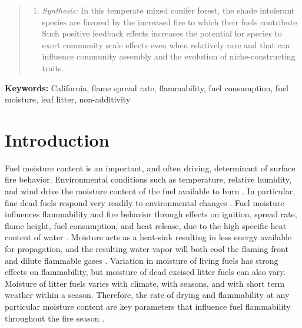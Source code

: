 \documentclass[letterpaper,12pt]{article}
\begin{document}
\begin{abstract}
\begin{enumerate}
    positive with fuel drying. Litter mixtures burn with fire behavior more
    similar to that of the most flammable constituent species and this effect
    increases as fuels dry.
      \item \emph{Synthesis:} In this temperate mixed conifer forest, the shade
    intolerant species are favored by the increased fire to which their fuels
    contribute Such positive feedback effects increases the potential for
    species to exert community scale effects even when relatively rare and that
    can influence community assembly and the evolution of niche-constructing
    traits.
  \end{enumerate}
\end{abstract}

\noindent \textbf{Keywords:} California, flame spread rate, flammability, fuel consumption, fuel moisture, leaf litter, non-additivity

\newpage

\section*{Introduction}

Fuel moisture content is an important, and often driving, determinant of
surface fire behavior. Environmental conditions such as temperature, relative
humidity, and wind drive the moisture content of the fuel available to burn
\citep{Kreye+Varner+etal-2018}. In particular, fine dead fuels respond very
readily to environmental changes \citep{Nelson-2001}. Fuel moisture influences
flammability and fire behavior through effects on ignition, spread rate, flame
height, fuel consumption, and heat release, due to the high specific heat
content of water \citep{Rothermel-1972, Nelson-2001}. Moisture acts as a
heat-sink resulting in less energy available for propagation, and the resulting
water vapor will both cool the flaming front and dilute flammable gases
\citep{Albini-1976, Shafizadeh-1977}. Variation in moisture of living fuels has
strong effects on flammability, but moisture of dead excised litter fuels can
also vary. Moisture of litter fuels varies with climate, with seasons, and with
short term weather within a season. Therefore, the rate of drying and
flammability at any particular moisture content are key parameters that
influence fuel flammability throughout the fire season \citep{Nelson-2001}.
\end{document}
